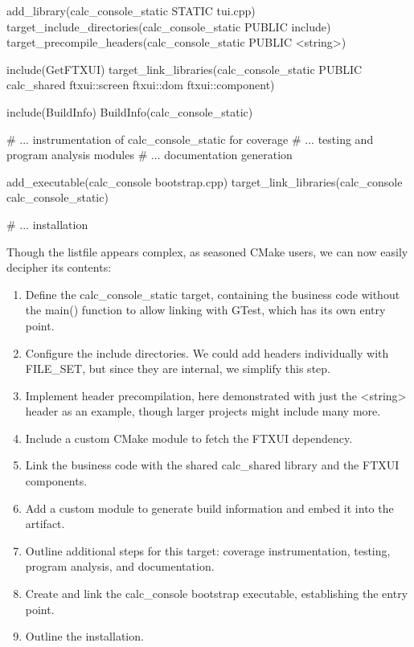 
\begin{cmake}
add_library(calc_console_static STATIC tui.cpp)
target_include_directories(calc_console_static PUBLIC include)
target_precompile_headers(calc_console_static PUBLIC <string>)

include(GetFTXUI)
target_link_libraries(calc_console_static PUBLIC calc_shared
                      ftxui::screen ftxui::dom ftxui::component)

include(BuildInfo)
BuildInfo(calc_console_static)

# ... instrumentation of calc_console_static for coverage
# ... testing and program analysis modules
# ... documentation generation

add_executable(calc_console bootstrap.cpp)
target_link_libraries(calc_console calc_console_static)

# ... installation
\end{cmake}

Though the listfile appears complex, as seasoned CMake users, we can now easily decipher its contents:

\begin{enumerate}
\item
Define the calc\_console\_static target, containing the business code without the main() function to allow linking with GTest, which has its own entry point.

\item
Configure the include directories. We could add headers individually with FILE\_SET, but since they are internal, we simplify this step.

\item
Implement header precompilation, here demonstrated with just the <string> header as an example, though larger projects might include many more.

\item
Include a custom CMake module to fetch the FTXUI dependency.

\item
Link the business code with the shared calc\_shared library and the FTXUI components.

\item
Add a custom module to generate build information and embed it into the artifact.

\item
Outline additional steps for this target: coverage instrumentation, testing, program analysis, and documentation.

\item
Create and link the calc\_console bootstrap executable, establishing the entry point.

\item
Outline the installation.
\end{enumerate}

